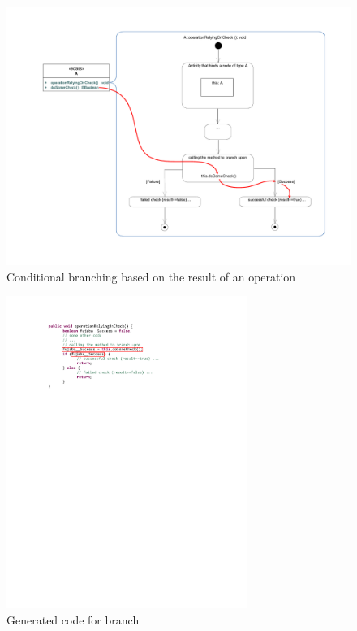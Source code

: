 \begin{figure}[htp]
\begin{center}
  \includegraphics[width=1\textwidth]{pics/advancedTopics/branching/SDM_with_branch}
  \caption{Conditional branching based on the result of an operation}
  \label{fig:cond_branch_on_op}
\end{center}
\end{figure}

\begin{figure}[htp]
\begin{center}
  \includegraphics[width=0.7\textwidth]{pics/advancedTopics/branching/generated_code}
  \caption{Generated code for branch}
  \label{fig:cond_branch_on_op_code}
\end{center}
\end{figure}

